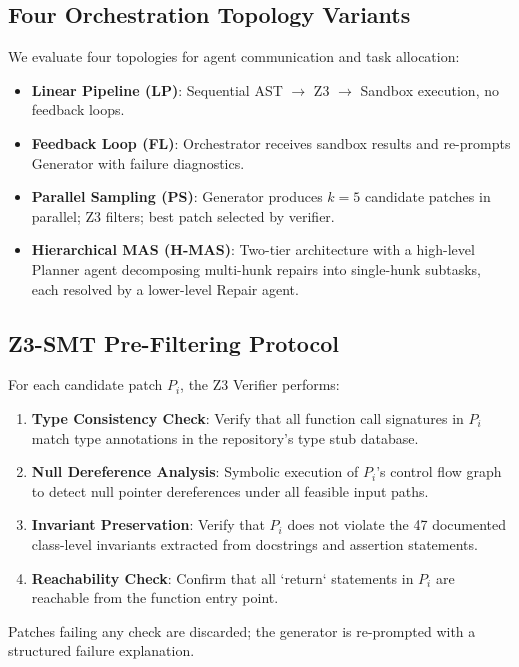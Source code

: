 \documentclass[10pt,journal,compsoc,twocolumn]{IEEEtran}
\begin{document}
\subsection{Four Orchestration Topology Variants}


We evaluate four topologies for agent communication and task allocation:

\begin{itemize}
  \item \textbf{Linear Pipeline (LP)}: Sequential AST $\rightarrow$ Z3 $\rightarrow$ Sandbox execution, no feedback loops.
  \item \textbf{Feedback Loop (FL)}: Orchestrator receives sandbox results and re-prompts Generator with failure diagnostics.
  \item \textbf{Parallel Sampling (PS)}: Generator produces $k = 5$ candidate patches in parallel; Z3 filters; best patch selected by verifier.
  \item \textbf{Hierarchical MAS (H-MAS)}: Two-tier architecture with a high-level Planner agent decomposing multi-hunk repairs into single-hunk subtasks, each resolved by a lower-level Repair agent.
\end{itemize}


\subsection{Z3-SMT Pre-Filtering Protocol}


For each candidate patch $P_i$, the Z3 Verifier performs:

\begin{enumerate}
  \item \textbf{Type Consistency Check}: Verify that all function call signatures in $P_i$ match type annotations in the repository's type stub database.
  \item \textbf{Null Dereference Analysis}: Symbolic execution of $P_i$'s control flow graph to detect null pointer dereferences under all feasible input paths.
  \item \textbf{Invariant Preservation}: Verify that $P_i$ does not violate the 47 documented class-level invariants extracted from docstrings and assertion statements.
  \item \textbf{Reachability Check}: Confirm that all `return` statements in $P_i$ are reachable from the function entry point.
\end{enumerate}

Patches failing any check are discarded; the generator is re-prompted with a structured failure explanation.
\end{document}
